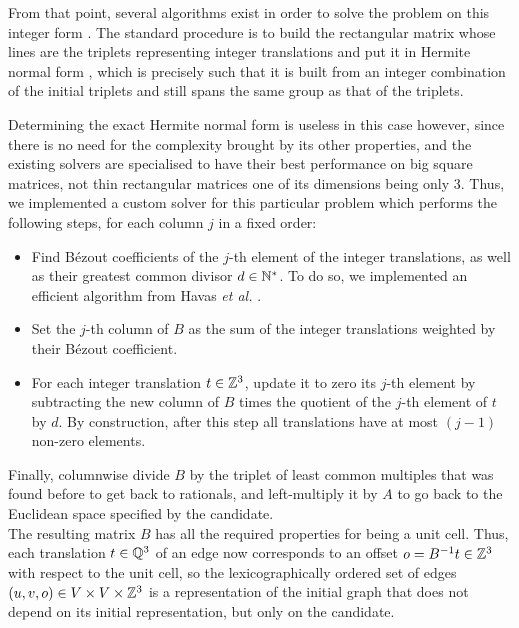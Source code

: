 \documentclass[main.tex]{subfiles}
\begin{document}
From that point, several algorithms exist in order to solve the problem on this integer form \autocite{sparseLinearRational,blackbox,Dixon,Wiedemann}. The standard procedure is to build the rectangular matrix whose lines are the triplets representing integer translations and put it in Hermite normal form \autocite{gcd}, which is precisely such that it is built from an integer combination of the initial triplets and still spans the same group as that of the triplets.

Determining the exact Hermite normal form is useless in this case however, since there is no need for the complexity brought by its other properties, and the existing solvers are specialised to have their best performance on big square matrices, not thin rectangular matrices one of its dimensions being only 3. Thus, we implemented a custom solver for this particular problem which performs the following steps, for each column $j$ in a fixed order:
\begin{itemize}[noitemsep]
	\item Find B\'{e}zout coefficients of the $j$-th element of the integer translations, as well as their greatest common divisor $d\in\mathbb{N}^*$. To do so, we implemented an efficient algorithm from Havas \textit{et al.} \autocite{gcd}.
	\item Set the $j$-th column of $B$ as the sum of the integer translations weighted by their B\'{e}zout coefficient. %
	\item For each integer translation $t\in\mathbb{Z}^3$, update it to zero its $j$-th element by subtracting the new column of $B$ times the quotient of the $j$-th element of $t$ by $d$. By construction, after this step all translations have at most $(j-1)$ non-zero elements.
\end{itemize}
Finally, columnwise divide $B$ by the triplet of least common multiples that was found before to get back to rationals, and left-multiply it by $A$ to go back to the Euclidean space specified by the candidate.\\

The resulting matrix $B$ has all the required properties for being a unit cell. Thus, each translation $t\in\mathbb{Q}^3$ of an edge now corresponds to an offset $o = B^{-1}t\in\mathbb{Z}^3$ with respect to the unit cell, so the lexicographically ordered set of edges $(u,v,o)\in V\times V\times\mathbb{Z}^3$ is a representation of the initial graph that does not depend on its initial representation, but only on the candidate.
\end{document}
